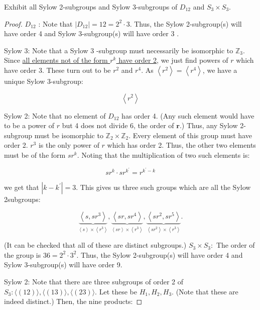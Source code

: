 \begin{exercise}
    Exhibit all Sylow 2-subgroups and Sylow 3-subgroups of $D_{12}$ and $S_3 \times S_3$.
\end{exercise}  

\begin{proof}
    $D_{12}$ :
    Note that $\left|D_{12}\right|=12=2^2 \cdot 3$. Thus, the Sylow 2-subgroup(s) will have order 4 and Sylow 3-subgroup(s) will have order 3 .
    
    Sylow 3:
    Note that a Sylow 3 -subgroup must necessarily be isomorphic to $\mathbb{Z}_3$. Since \underline{all elements not of the form $r^k$ have order 2}, we just find powers of $r$ which have order 3. These turn out to be $r^2$ and $r^4$. As $\left\langle r^2\right\rangle=\left\langle r^4\right\rangle$, we have a unique Sylow 3-subgroup:
    
    $$
    \left\langle r^2\right\rangle
    $$
    
    
    Sylow 2:
    Note that no element of $D_{12}$ has order 4. (Any such element would have to be a power of $r$ but 4 does not divide 6, the order of $\boldsymbol{r}$.)
    Thus, any Sylow 2-subgroup must be isomorphic to $\mathbb{Z}_2 \times \mathbb{Z}_2$.
    Every element of this group must have order 2. $r^3$ is the only power of $r$ which has order 2. Thus, the other two elements must be of the form $s r^k$. Noting that the multiplication of two such elements is:
    
    $$
    s r^k \cdot s r^{k^{\prime}}=r^{k^{\prime}-k}
    $$
    
    we get that $\left|k-k^{\prime}\right|=3$. This gives us three such groups which are all the Sylow 2subgroups:
    
    $$
    \underbrace{\left\langle s, s r^3\right\rangle}_{\left\langle s\right\rangle\times \left\langle r^3\right\rangle},\underbrace{\left\langle s r, s r^4\right\rangle}_{\left\langle s r\right\rangle\times \left\langle r^3\right\rangle},\underbrace{\left\langle s r^2, s r^5\right\rangle}_{\left\langle s r^2\right\rangle\times \left\langle r^3\right\rangle} .
    $$
    
    (It can be checked that all of these are distinct subgroups.)
    $S_3 \times S_3:$
    The order of the group is $36=2^2 \cdot 3^2$. Thus, the Sylow 2-subgroup(s) will have order 4 and Sylow 3-subgroup(s) will have order 9.
    
    Sylow 2:
    Note that there are three subgroups of order 2 of $S_3:\langle(12)\rangle,\langle(13)\rangle,\langle (23)\rangle$. Let these be $H_1, H_2, H_3$. (Note that these are indeed distinct.)
    Then, the nine products:
    

\end{proof}

